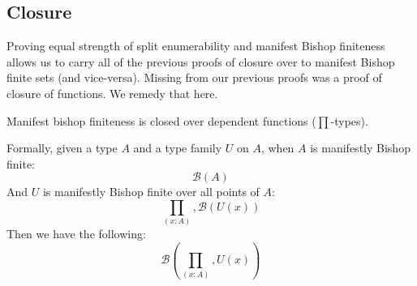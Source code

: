 \subsection{Closure}
Proving equal strength of split enumerability and manifest Bishop finiteness
allows us to carry all of the previous proofs of closure over to manifest Bishop
finite sets (and vice-versa).
Missing from our previous proofs was a proof of closure of functions.
We remedy that here.
\begin{rm-theorem}
  Manifest bishop finiteness is closed over dependent functions (\(\prod\)-types).

  Formally, given a type \(A\) and a type family \(U\) on \(A\), when \(A\) is
  manifestly Bishop finite:
  \begin{equation}
    \mathcal{B}\left( A \right)
  \end{equation}
  And \(U\) is manifestly Bishop finite over all points of \(A\):
  \begin{equation}
    \prod_{(x : A)} , \mathcal{B}\left( U(x) \right)
  \end{equation}
  Then we have the following:
  \begin{equation}
    \mathcal{B}\left(\prod_{(x : A)} , U(x)\right)
  \end{equation}
\end{rm-theorem}
